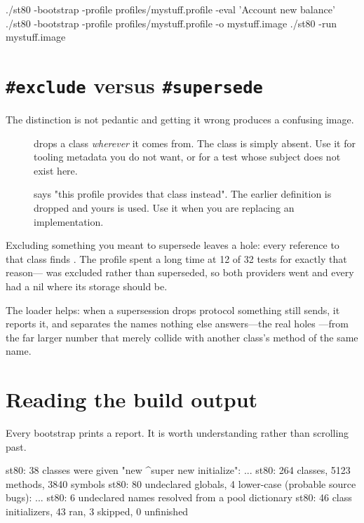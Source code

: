 \begin{sh}
./st80 -bootstrap -profile profiles/mystuff.profile -eval 'Account new balance'
./st80 -bootstrap -profile profiles/mystuff.profile -o mystuff.image
./st80 -run mystuff.image
\end{sh}

\section{\texttt{\#exclude} versus \texttt{\#supersede}}

The distinction is not pedantic and getting it wrong produces a confusing
image.

\begin{description}
\item[] drops a class \emph{wherever} it comes from. The class
  is simply absent. Use it for tooling metadata you do not want, or for a test
  whose subject does not exist here.
\item[] says "this profile provides that class instead". The
  earlier definition is dropped and yours is used. Use it when you are
  replacing an implementation.
\end{description}

Excluding something you meant to supersede leaves a hole: every reference to
that class finds . The  profile spent a long time at
12 of 32 tests for exactly that reason--- was excluded rather
than superseded, so both providers went and every  had a nil where
its storage should be.

The loader helps: when a supersession drops protocol something still sends, it
reports it, and separates the names nothing else answers---the real holes
---from the far larger number that merely collide with another class's method
of the same name.

\section{Reading the build output}

Every bootstrap prints a report. It is worth understanding rather than
scrolling past.

\begin{plain}
st80: 38 classes were given "new ^super new initialize": ...
st80: 264 classes, 5123 methods, 3840 symbols
st80: 80 undeclared globals, 4 lower-case (probable source bugs): ...
st80: 6 undeclared names resolved from a pool dictionary
st80: 46 class initializers, 43 ran, 3 skipped, 0 unfinished
\end{plain}

